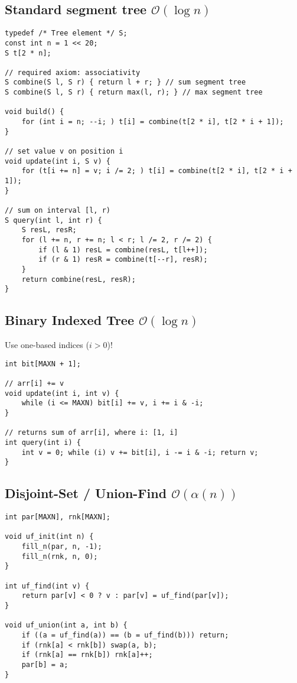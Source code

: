 \documentclass{article}
\begin{document}
\subsection{Standard segment tree $\mathcal{O}(\log n)$}

\begin{lstlisting}
typedef /* Tree element */ S;
const int n = 1 << 20;
S t[2 * n];

// required axiom: associativity
S combine(S l, S r) { return l + r; } // sum segment tree
S combine(S l, S r) { return max(l, r); } // max segment tree

void build() {
	for (int i = n; --i; ) t[i] = combine(t[2 * i], t[2 * i + 1]);
}

// set value v on position i
void update(int i, S v) {
	for (t[i += n] = v; i /= 2; ) t[i] = combine(t[2 * i], t[2 * i + 1]);
}

// sum on interval [l, r)
S query(int l, int r) {
	S resL, resR;
	for (l += n, r += n; l < r; l /= 2, r /= 2) {
		if (l & 1) resL = combine(resL, t[l++]);
		if (r & 1) resR = combine(t[--r], resR);
	}
	return combine(resL, resR);
}
\end{lstlisting}

\subsection{Binary Indexed Tree $\mathcal{O}(\log n)$}

Use one-based indices ($i > 0$)!

\begin{lstlisting}
int bit[MAXN + 1];

// arr[i] += v
void update(int i, int v) {
	while (i <= MAXN) bit[i] += v, i += i & -i;
}

// returns sum of arr[i], where i: [1, i]
int query(int i) {
	int v = 0; while (i) v += bit[i], i -= i & -i; return v;
}
\end{lstlisting}

\subsection{Disjoint-Set / Union-Find $\mathcal{O}(\alpha (n))$}

\begin{lstlisting}
int par[MAXN], rnk[MAXN];

void uf_init(int n) {
	fill_n(par, n, -1);
	fill_n(rnk, n, 0);
}

int uf_find(int v) {
	return par[v] < 0 ? v : par[v] = uf_find(par[v]);
}

void uf_union(int a, int b) {
	if ((a = uf_find(a)) == (b = uf_find(b))) return;
	if (rnk[a] < rnk[b]) swap(a, b);
	if (rnk[a] == rnk[b]) rnk[a]++;
	par[b] = a;
}
\end{lstlisting}
\end{document}
